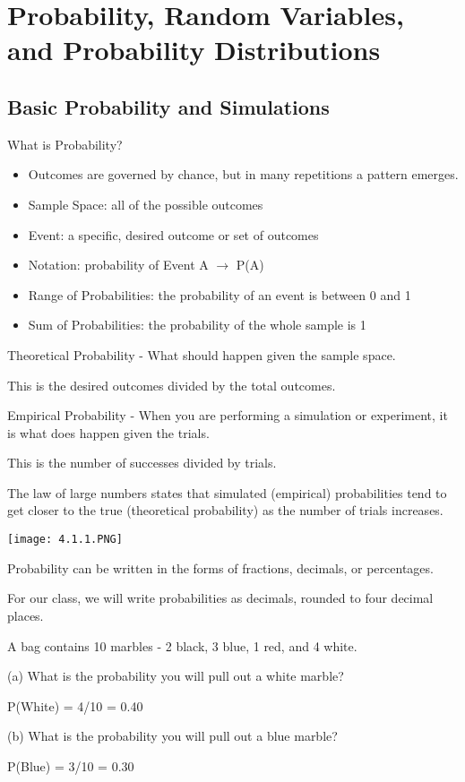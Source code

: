\documentclass[../stats.tex]{subfiles}
\begin{document}
\chapter{Probability, Random Variables, and Probability Distributions}
\section{Basic Probability and Simulations}
What is Probability?
\begin{itemize}
    \item Outcomes are governed by chance, but in many repetitions a pattern emerges.
    \item Sample Space: all of the possible outcomes 
    \item Event: a specific, desired outcome or set of outcomes 
    \item Notation: probability of Event A $\rightarrow$ P(A)
    \item Range of Probabilities: the probability of an event is between 0 and 1 
    \item Sum of Probabilities: the probability of the whole sample is 1
\end{itemize}

Theoretical Probability - What should happen given the sample space.

This is the desired outcomes divided by the total outcomes.

Empirical Probability - When you are performing a simulation or experiment, it is what does happen given the trials.

This is the number of successes divided by trials.

The law of large numbers states that simulated (empirical) probabilities tend to get closer to the true (theoretical probability) as the number of trials increases.

\begin{center}
    \texttt{[image: 4.1.1.PNG]}
\end{center}
Probability can be written in the forms of fractions, decimals, or percentages.

For our class, we will write probabilities as decimals, rounded to four decimal places.

\begin{example}
    A bag contains 10 marbles - 2 black, 3 blue, 1 red, and 4 white.

    (a) What is the probability you will pull out a white marble?

    P(White) = 4/10 = 0.40

    (b) What is the probability you will pull out a blue marble?

    P(Blue) = 3/10 = 0.30
\end{example}
\end{document}
